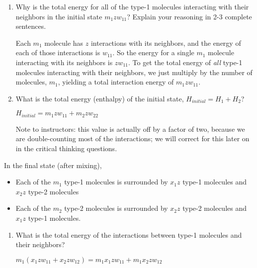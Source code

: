 \begin{activity}
\begin{ctqs}
		\begin{enumerate}
			\item Why is the total energy for all of the type-1 molecules interacting with their neighbors in the initial state $m_1 z w_{11}$?  Explain your reasoning in 2-3 complete sentences.
			
				\begin{solution}[2.5in]
				
					Each $m_1$ molecule has $z$ interactions with its neighbors, and the energy of each of those interactions is $w_{11}$.  So the energy for a single $m_1$ molecule interacting with its neighbors is $zw_{11}$.  To get the total energy of \emph{all} type-1 molecules interacting with their neighbors, we just multiply by the number of molecules, $m_1$, yielding a total interaction energy of $m_1 z w_{11}$.
				
				\end{solution}
				
			\item What is the total energy (enthalpy) of the initial state, $H_{initial} = H_1 + H_2$?
		
			\begin{solution}[1.25in]
				$H_{initial} = m_1 z w_{11} + m_2 z w_{22}$
			
				Note to instructors: this value is actually off by a factor of two, because we are double-counting most of the interactions; we will correct for this later on in the critical thinking questions. 
			\end{solution}
			
		\end{enumerate}

	\question In the final state (after mixing),
	
		\begin{itemize}[topsep=3pt,itemsep=0pt]
			\item Each of the $m_1$ type-1 molecules is surrounded by $x_1 z$ type-1 molecules and $x_2 z$ type-2 molecules
			\item Each of the $m_2$ type-2 molecules is surrounded by $x_2 z$ type-2 molecules and $x_1 z$ type-1 molecules.
		\end{itemize}
		
		\begin{enumerate}
			\item What is the total energy of the interactions between type-1 molecules and their neighbors?
			
				\begin{solution}[1.25in]
					$m_1(x_1 z w_{11} + x_2 z w_{12}) = m_1 x_1 z w_{11} + m_1 x_2 z w_{12}$
				\end{solution}
				

\end{enumerate}
\end{ctqs}
\end{activity}
